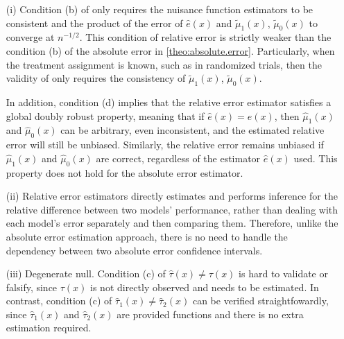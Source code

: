\documentclass{article}
\theoremstyle{plain}
\theoremstyle{definition}
\theoremstyle{plain}
\begin{document}
\begin{itemize}
    \item [(i)] Condition (b) of  only requires the nuisance function estimators to be consistent and the product of the error of $\hat{e}(x)$ and $\tilde{\mu}_{1}(x)$, $\tilde{\mu}_{0}(x)$ to converge at $n^{-1/2}$.
    This condition of relative error is strictly weaker than the condition (b) of the absolute error in \cref{theo:absolute.error}.
    Particularly, when the treatment assignment is known, such as in randomized trials, then the validity of  only requires the consistency of $\tilde{\mu}_{1}(x)$, $\tilde{\mu}_{0}(x)$.


    In addition, condition (d) implies that the relative error estimator satisfies a global doubly robust property, meaning that if $\hat{e}(x) = e(x)$, then $\hat{\mu}_1(x)$ and $\hat{\mu}_0(x)$ can be arbitrary, even inconsistent, and the estimated relative error will still be unbiased. Similarly, the relative error remains unbiased if $\hat{\mu}_1(x)$ and $\hat{\mu}_0(x)$ are correct, regardless of the estimator $\hat{e}(x)$ used.
    This property does not hold for the absolute error estimator.

    
    \item [(ii)] Relative error estimators directly estimates and performs inference for the relative difference between two models' performance, rather than dealing with each model's error separately and then comparing them. 
    Therefore, unlike the absolute error estimation approach, there is no need to handle the dependency between two absolute error confidence intervals.
    
    \item [(iii)] Degenerate null. 
    Condition (c) of  $\hat{\tau}(x) \neq \tau(x)$ is hard to validate or falsify, since $\tau(x)$ is not directly observed and needs to be estimated.
    In contrast, condition (c) of  $\hat{\tau}_1(x) \neq \hat{\tau}_2(x)$ can be verified straightfowardly, since $\hat{\tau}_1(x)$ and $\hat{\tau}_2(x)$ are provided functions and there is no extra estimation required.



\end{itemize}
\end{document}
